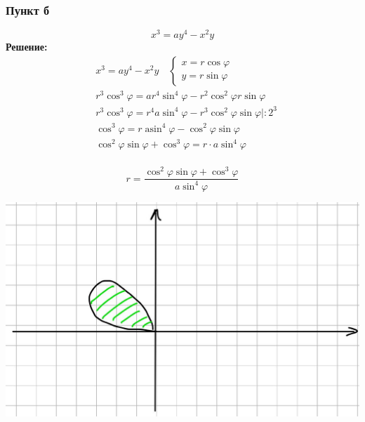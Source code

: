 \subsubsection*{Пункт б}
$$x^{3}=a y^{4}-x^{2} y$$
\textbf{Решение:} \\
$$
\begin{aligned}
& x^{3}=a y^{4}-x^{2} y \quad\left\{\begin{array}{l}
x=r \cos \varphi \\
y=r \sin \varphi
\end{array}\right. \\
& r^{3} \cos ^{3} \varphi=a r^{4} \sin ^{4} \varphi-r^{2} \cos ^{2} \varphi r \sin \varphi \\
& r^{3} \cos ^{3} \varphi=r^{4} a \sin ^{4} \varphi-r^{3} \cos ^{2} \varphi \sin \varphi \mid: 2^{3} \\
& \cos ^{3} \varphi=r \operatorname{asin}^{4} \varphi-\cos ^{2} \varphi \sin \varphi \\
& \cos ^{2} \varphi \sin \varphi+\cos ^{3} \varphi=r \cdot a \sin ^{4} \varphi \\
\end{aligned}
$$

$$
r=\frac{\cos ^{2} \varphi \sin \varphi+\cos ^{3} \varphi}{a \sin ^{4} \varphi}
$$
\begin{center}
\includegraphics[scale=0.1]{pics/pic6.jpg}
\end{center}

